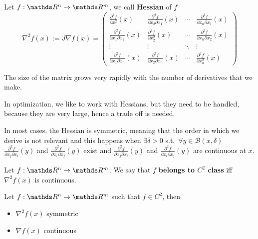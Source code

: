 \documentclass[computationalMathematics.tex]{subfiles}
\begin{document}
\begin{definition}[Hessian]
  Let $f: \R^n \to \R^m$, we call \textbf{Hessian} of $f$
  \[
  \nabla^2 f(x) := J \nabla f(x) =
  \begin{pmatrix}
   \frac{\partial^2 f}{\partial x_1^2}(x) &
   \frac{\partial^2 f}{\partial x_2 \partial x_1}(x) & \cdots &
   \frac{\partial^2 f}{\partial x_n \partial x_1}(x)\\
   \frac{\partial^2 f}{\partial x_1 \partial x_2}(x) &
   \frac{\partial^2 f}{\partial x_2^2}(x) & \cdots &
   \frac{\partial^2 f}{\partial x_n \partial x_2}(x) \\
   \vdots & \vdots & \ddots & \vdots \\
   \frac{\partial^2 f}{\partial x_1 \partial x_n}(x) &
   \frac{\partial^2 f}{\partial x_2 \partial x_n}(x) & \cdots &
   \frac{\partial^2 f}{\partial x_n^2}(x)
  \end{pmatrix}
\]
\end{definition}

The size of the matrix grows very rapidly with the number of derivatives that we make.

In optimization, we like to work with Hessians, but they need to be handled, because they are very large, hence a trade off is needed.

In most cases, the Hessian is symmetric, meaning that the order in which we derive is not relevant and this happens when $\exists \delta > 0$ s.t.~$\forall y \in \mathcal{B}(x, \delta)$ $\frac{\partial^2 f}{\partial x_j \partial x_i}(y)$ and  $\frac{\partial^2 f}{\partial x_i \partial x_j}(y)$ exist and $\frac{\partial^2 f}{\partial x_j \partial x_i}(y)$ and  $\frac{\partial^2 f}{\partial x_i \partial x_j}(y)$ are continuous at $x$.


\begin{definition}[$C^2$ functions]
  Let $f: \R^n \to \R^m$. We say that $f$ \textbf{belongs to $C^2$ class} iff $\nabla^2 f(x)$ is continuous.
\end{definition}

\begin{property}
Let $f: \R^n \to \R^m$ such that $f \in C^2$, then
\begin{itemize}
  \item $\nabla^2 f(x)$ symmetric
  \item $\nabla f(x)$ continuous
\end{itemize}
\end{property}
\end{document}
